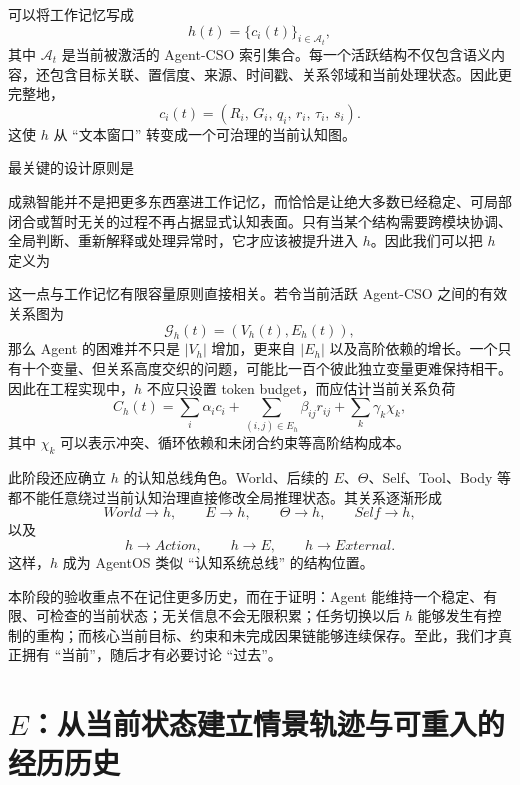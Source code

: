可以将工作记忆写成
\[
h(t)
=
\{
c_i(t)
\}_{i\in\mathcal A_t},
\]
其中 $\mathcal A_t$ 是当前被激活的 Agent-CSO 索引集合。每一个活跃结构不仅包含语义内容，还包含目标关联、置信度、来源、时间戳、关系邻域和当前处理状态。因此更完整地，
\[
c_i(t)
=
\left(
R_i,\,
G_i,\,
q_i,\,
r_i,\,
\tau_i,\,
s_i
\right).
\]
这使 $h$ 从 ``文本窗口'' 转变成一个可治理的当前认知图。

最关键的设计原则是
\begin{statementbox}
\centering
{}
\end{statementbox}
成熟智能并不是把更多东西塞进工作记忆，而恰恰是让绝大多数已经稳定、可局部闭合或暂时无关的过程不再占据显式认知表面。只有当某个结构需要跨模块协调、全局判断、重新解释或处理异常时，它才应该被提升进入 $h$。因此我们可以把 $h$ 定义为
\begin{statementbox}
\centering
{}
\end{statementbox}

这一点与工作记忆有限容量原则直接相关。若令当前活跃 Agent-CSO 之间的有效关系图为
\[
\mathcal G_h(t)
=
\left(
V_h(t),E_h(t)
\right),
\]
那么 Agent 的困难并不只是 $|V_h|$ 增加，更来自 $|E_h|$ 以及高阶依赖的增长。一个只有十个变量、但关系高度交织的问题，可能比一百个彼此独立变量更难保持相干。因此在工程实现中，$h$ 不应只设置 token budget，而应估计当前关系负荷
\[
C_h(t)
=
\sum_i \alpha_i c_i
+
\sum_{(i,j)\in E_h}\beta_{ij}r_{ij}
+
\sum_k\gamma_k\chi_k,
\]
其中 $\chi_k$ 可以表示冲突、循环依赖和未闭合约束等高阶结构成本。

此阶段还应确立 $h$ 的认知总线角色。World、后续的 $E$、$\Theta$、Self、Tool、Body 等都不能任意绕过当前认知治理直接修改全局推理状态。其关系逐渐形成
\[
World\rightarrow h,\qquad
E\rightarrow h,\qquad
\Theta\rightarrow h,\qquad
Self\rightarrow h,
\]
以及
\[
h\rightarrow Action,\qquad
h\rightarrow E,\qquad
h\rightarrow External.
\]
这样，$h$ 成为 AgentOS 类似 ``认知系统总线'' 的结构位置。

本阶段的验收重点不在记住更多历史，而在于证明：Agent 能维持一个稳定、有限、可检查的当前状态；无关信息不会无限积累；任务切换以后 $h$ 能够发生有控制的重构；而核心当前目标、约束和未完成因果链能够连续保存。至此，我们才真正拥有 ``当前''，随后才有必要讨论 ``过去''。

\section{$E$：从当前状态建立情景轨迹与可重入的经历历史}

